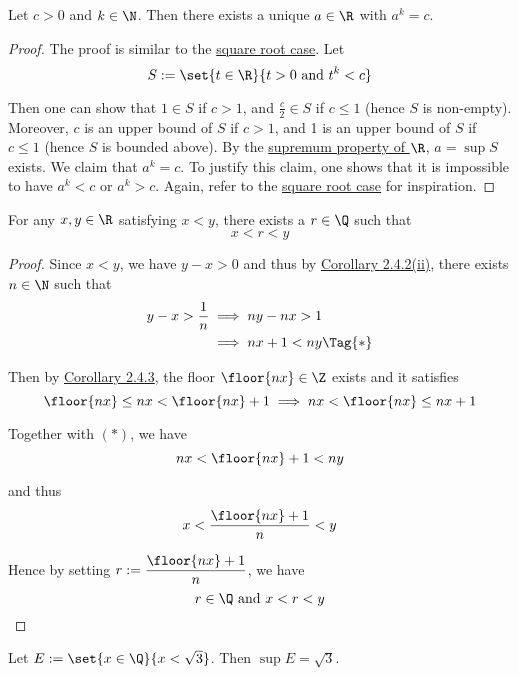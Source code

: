 Let $c>0$ and $k\in\N$. Then there exists a unique $a\in\R$ with $a^k=c$.

\begin{proof}
  The proof is similar to the \href{b88beb7}{square root case}. Let
  $$
    S:=\set{t\in\R}{t>0\text{ and }t^k<c}
  $$

  Then one can show that $1\in S$ if $c>1$, and $\frac c2\in S$ if $c\leq1$
  (hence $S$ is non-empty). Moreover, $c$ is an upper bound of $S$ if $c>1$, and
  1 is an upper bound of $S$ if $c\leq1$ (hence $S$ is bounded above). By the
  \href{f330cf9}{supremum property of $\R$}, $a=\sup S$ exists. We claim that
  $a^k=c$. To justify this claim, one shows that it is impossible to have $a^k<c$
  or $a^k>c$. Again, refer to the \href{b88beb7}{square root case} for
  inspiration.
\end{proof}

\label{d0c9c52}

For any $x,y\in\R$ satisfying $x<y$, there exists a $r\in\Q$ such that
$$
  x<r<y
$$

\begin{proof}
  Since $x<y$, we have $y-x>0$ and thus by \href{d845856}{Corollary 2.4.2(ii)},
  there exists $n\in\N$ such that
  \begin{align*}
    y-x>\frac1n &\implies ny-nx>1        \\
                &\implies nx+1<ny\Tag{*}
  \end{align*}

  Then by \href{abc7dbd}{Corollary 2.4.3}, the floor $\floor{nx}\in\Z$ exists and
  it satisfies
  $$
    \floor{nx}\leq nx <\floor{nx}+1\implies nx<\floor{nx}\leq nx+1
  $$

  Together with $(*)$, we have
  $$
    nx<\floor{nx}+1<ny
  $$

  and thus
  $$
    x<\frac{\floor{nx}+1}{n}<y
  $$

  Hence by setting $r:=\dfrac{\floor{nx}+1}{n}$, we have
  $$
    r\in\Q\text{ and }x<r<y
  $$
\end{proof}

\label{ade99b7}

Let $E:=\set{x\in\Q}{x<\sqrt3}$. Then $\sup E=\sqrt3$.

